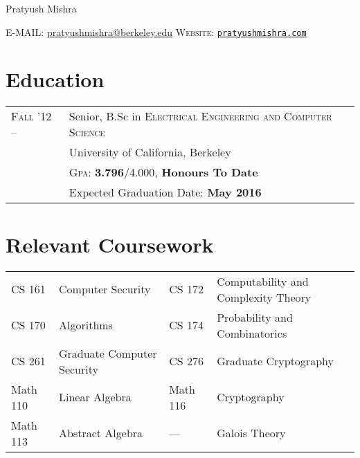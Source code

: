 \documentclass[letter,10pt]{article}
\begin{document}
\pagestyle{empty} %


\par{\centering
		{\Huge Pratyush Mishra
	}\bigskip\par}


        \textsc{E-MAIL:} \href{mailto:pratyushmishra@berkeley.edu}{pratyushmishra@berkeley.edu}
        \hfill
        \textsc{Website:} \href{http://www.pratyushmishra.com}{\texttt{pratyushmishra.com}}

\section{Education}
\begin{tabular}{R{2.5cm}p{11cm}}

  \textsc{Fall '12 --} & Senior, B.Sc in \textsc{Electrical Engineering and Computer Science} \\
                       & University of California, Berkeley \\
                       & \textsc{Gpa:} \textbf{3.796}/4.000, \textbf{Honours To Date} \\
                       & Expected Graduation Date: \textbf{May 2016}\\
\end{tabular}

\section{Relevant Coursework}
\begin{tabular}{R{2.5cm}p{4.5cm}R{2cm}p{6cm}}

  CS 161   & Computer Security          & CS 172   & Computability and Complexity Theory\\
  CS 170   & Algorithms                 & CS 174   & Probability and Combinatorics\\
  CS 261   & Graduate Computer Security & CS 276   & Graduate Cryptography\\
  Math 110 & Linear Algebra             & Math 116 & Cryptography\\
  Math 113 & Abstract Algebra           & ---      & Galois Theory\\
\end{tabular}



\end{document}
